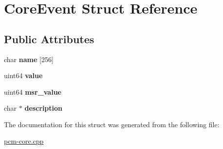 \hypertarget{struct_core_event}{}\section{Core\+Event Struct Reference}
\label{struct_core_event}
\subsection*{Public Attributes}
\begin{DoxyCompactItemize}
\item 
\mbox{\label{struct_core_event_adfc317377ca5e570e76cefb0bcb956a7}} 
char {\bfseries name} \mbox{[}256\mbox{]}
\item 
\mbox{\label{struct_core_event_aee18e455c55f0af436f9232e80eba77d}} 
uint64 {\bfseries value}
\item 
\mbox{\label{struct_core_event_a6bea66846abee2af316f5c38069d0768}} 
uint64 {\bfseries msr\+\_\+value}
\item 
\mbox{\label{struct_core_event_a938a4c4c72139b70a6a647698e4a2121}} 
char $\ast$ {\bfseries description}
\end{DoxyCompactItemize}


The documentation for this struct was generated from the following file\+:\begin{DoxyCompactItemize}
\item 
\mbox{\hyperlink{pcm-core_8cpp}{pcm-\/core.\+cpp}}\end{DoxyCompactItemize}
